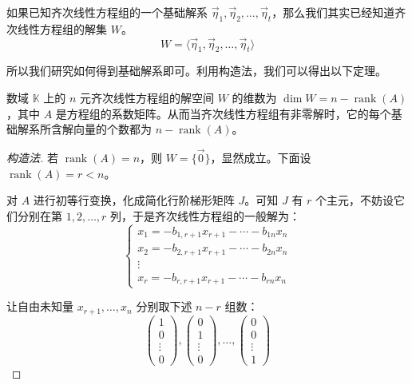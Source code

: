 如果已知齐次线性方程组的一个基础解系 $\vec \eta_1, \vec \eta_2, \ldots, \vec \eta_t$，那么我们其实已经知道齐次线性方程组的解集 $W$。
$$
W = \langle \vec \eta_1, \vec \eta_2, \ldots, \vec \eta_t \rangle
$$

所以我们研究如何得到基础解系即可。利用构造法，我们可以得出以下定理。

\begin{theorem}
	数域 $\mathbb K$ 上的 $n$ 元齐次线性方程组的解空间 $W$ 的维数为 $\dim W = n - \operatorname{rank}(A)$，其中 $A$ 是方程组的系数矩阵。从而当齐次线性方程组有非零解时，它的每个基础解系所含解向量的个数都为 $n - \operatorname{rank}(A)$。
\end{theorem}

\begin{proof}[构造法]
	若 $\operatorname{rank}(A) = n$，则 $W = \{\vec 0\}$，显然成立。下面设 $\operatorname{rank}(A) = r < n$。

	对 $A$ 进行初等行变换，化成简化行阶梯形矩阵 $J$。可知 $J$ 有 $r$ 个主元，不妨设它们分别在第 $1, 2, \ldots, r$ 列，于是齐次线性方程组的一般解为：
	$$
	\begin{cases}
		x_1 = -b_{1, r + 1} x_{r + 1} - \cdots - b_{1n} x_n
		\\
		x_2 = -b_{2, r + 1} x_{r + 1} - \cdots - b_{2n} x_n
		\\
		\vdots
		\\
		x_r = -b_{r, r + 1} x_{r + 1} - \cdots - b_{rn} x_n
	\end{cases}
	$$

	让自由未知量 $x_{r + 1}, \ldots, x_n$ 分别取下述 $n - r$ 组数：
	$$
	\begin{pmatrix}
		1 \\ 0 \\ \vdots \\ 0
	\end{pmatrix},
	\begin{pmatrix}
		0 \\ 1 \\ \vdots \\ 0
	\end{pmatrix},
	\ldots,
	\begin{pmatrix}
		0 \\ 0 \\ \vdots \\ 1
	\end{pmatrix}
	$$


\end{proof}
